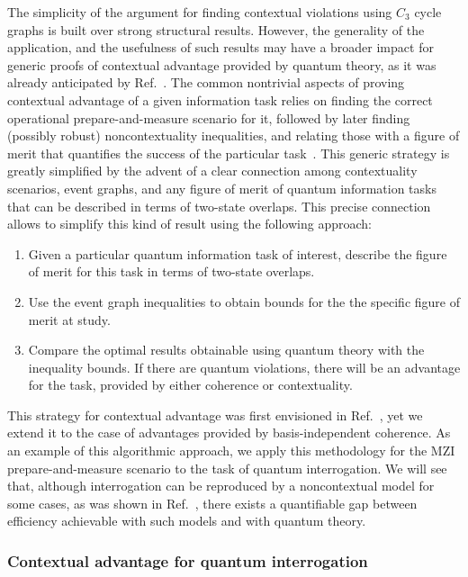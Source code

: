 \documentclass[a4paper,twocolumn,11pt,accepted=2024-01-17]{quantumarticle}
\begin{document}
The simplicity of the argument for finding contextual violations using $C_3$ cycle graphs is built over strong structural results. However, the generality of the application, and the usefulness of such results may have a broader impact for generic proofs of contextual advantage provided by quantum theory, as it was already anticipated by Ref.~\cite{Lostaglio2020contextualadvantage}. The common nontrivial aspects of  proving contextual advantage of a given information task relies on finding the correct operational prepare-and-measure scenario for it, followed by later finding (possibly robust) noncontextuality inequalities, and relating those with a figure of merit that quantifies the success of the particular task~\cite{Lostaglio2020contextualadvantage,schmid2018discrimination,flatt2021contextual,carceller2022quantum,mukherjee2021discriminating}. This generic strategy is greatly simplified by the advent of a clear connection among contextuality scenarios, event graphs, and any figure of merit of quantum information tasks that can be described in terms of two-state overlaps. This precise connection allows to simplify this kind of result using the following approach:
\begin{enumerate}
    \item Given a particular quantum information task of interest, describe the figure of merit for this task in terms of two-state overlaps.
    \item Use the event graph inequalities to obtain bounds for the {  the specific figure of merit at study}. 
    \item Compare the optimal results obtainable using quantum theory with the inequality bounds. If there are quantum violations, there will be an advantage for the task, provided by either coherence or contextuality. 
\end{enumerate}
This strategy for contextual advantage was first envisioned in Ref.~\cite{Lostaglio2020contextualadvantage}, yet we extend it to the case of advantages provided by basis-independent coherence. As an example of this algorithmic approach, we apply this methodology for the MZI prepare-and-measure scenario to the task of quantum interrogation. We will see that, although   interrogation can be reproduced by a noncontextual model for some cases, as was shown in Ref.~\cite{catani2021interference}, there exists a quantifiable gap between efficiency achievable with such models and with quantum theory.

\subsubsection{Contextual advantage for quantum interrogation}\label{subsubsec: contextual advantage}
\end{document}
